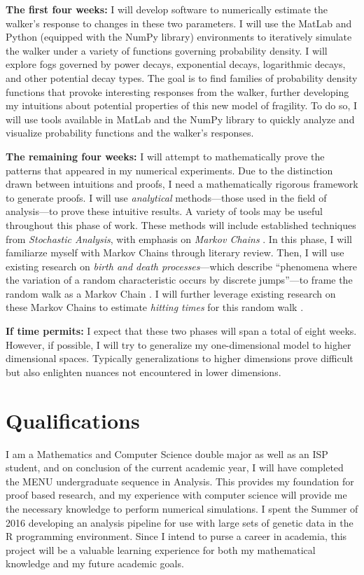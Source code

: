\documentclass[12pt,letterpaper]{article}
\begin{document}
    \textbf{The first four weeks:} I will develop software to numerically estimate the walker's response
    to changes in these two parameters. I will use the MatLab and Python (equipped with the NumPy
    library) environments to iteratively simulate the walker under a variety of functions governing
    probability density. I will explore fogs governed by power decays, exponential decays, logarithmic
    decays, and other potential decay types. The goal is to find families of probability density
    functions that provoke interesting responses from the walker, further developing my intuitions about
    potential properties of this new model of fragility. To do so, I will use tools available in MatLab
    and the NumPy library to quickly analyze and visualize probability functions and the walker's
    responses.
    
    \textbf{The remaining four weeks:} I will attempt to mathematically prove the patterns that appeared
    in my numerical experiments. Due to the distinction drawn between intuitions and proofs, I
    need a mathematically rigorous framework to generate proofs. I will use \emph{analytical}
    methods---those used in the field of analysis---to prove these intuitive results. A variety of tools
    may be useful throughout this phase of work. These methods will include established techniques from
    \emph{Stochastic Analysis}, with emphasis on \emph{Markov Chains} \cite{ibe}. In this phase, I will
    familiarze myself with Markov Chains through literary review. Then, I will use existing research on
    \emph{birth and death processes}---which describe ``phenomena where the variation of a random
    characteristic occurs by discrete jumps''---to frame the random walk as a Markov Chain
    \cite{stochastic}. I will further leverage existing research on these Markov Chains to estimate
    \emph{hitting times} for this random walk \cite{stochastic}.

    \textbf{If time permits:} I expect that these two phases will span a total of eight weeks. However,
    if possible, I will try to generalize my one-dimensional model to higher dimensional spaces.
    Typically generalizations to higher dimensions prove difficult but also enlighten nuances not
    encountered in lower dimensions.

    \section*{Qualifications}
    I am a Mathematics and Computer Science double major as well as an ISP student, and on conclusion of
    the current academic year, I will have completed the MENU undergraduate sequence in Analysis. This
    provides my foundation for proof based research, and my experience with computer science will
    provide me the necessary knowledge to perform numerical simulations. I spent the Summer of 2016
    developing an analysis pipeline for use with large sets of genetic data in the R programming
    environment. Since I intend to purse a career in academia, this project will be a valuable learning
    experience for both my mathematical knowledge and my future academic goals.

    \printbibliography
\end{document}
